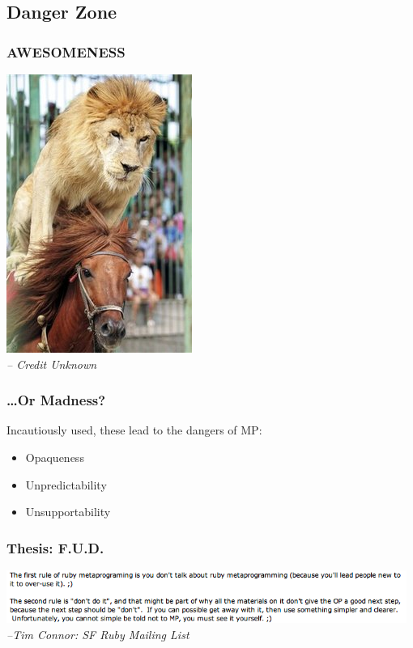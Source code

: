 \documentclass[slidestop,compress,mathserif]{beamer}
\begin{document}
\subsection{Danger Zone} %
\label{sub:danger_zone}

\begin{frame}
		\frametitle{AWESOMENESS}
		\begin{center}
			\includegraphics[scale=0.45]{img/lion_horse.jpg} \\
			\emph{-- Credit Unknown}
		\end{center}
\end{frame}

\begin{frame}
	\frametitle{{\ldots}Or Madness?}
	Incautiously used, these lead to the dangers of MP:
	\begin{itemize}
		\item Opaqueness
		\item Unpredictability
		\item Unsupportability
	\end{itemize}
\end{frame}

\begin{frame}
	\frametitle{Thesis:  F.U.D.}
		\includegraphics[width=0.98\textwidth, height=0.25\textheight]{img/tim_hates_mp.png}
		\vskip 0.5cm
		\emph{--Tim Connor:  SF Ruby Mailing List}
\end{frame}
\end{document}
